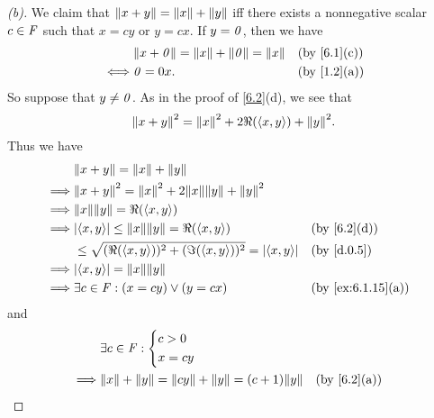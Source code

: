 \begin{proof}[(b)]
  We claim that \(\left\lVert x + y\right\rVert = \left\lVert x\right\rVert + \left\lVert y\right\rVert\) iff there exists a nonnegative scalar \(c \in \mathit{F}\) such that \(x = cy\) or \(y = cx\).
  If \(y = \mathit{0}\), then we have
  \begin{align*}
         & \norm{x + \zv} = \norm{x} + \norm{\zv} = \norm{x} &  & \text{(by \cref{6.1}(c))} \\
    \iff & \zv = 0x.                                         &  & \text{(by \cref{1.2}(a))}
  \end{align*}
  So suppose that \(y \neq \mathit{0}\).
  As in the proof of \cref{6.2}(d), we see that
  \[
    \norm{x + y}^2 = \norm{x}^2 + 2 \Re(\inn{x, y}) + \norm{y}^2.
  \]
  Thus we have
  \begin{align*}
             & \norm{x + y} = \norm{x} + \norm{y}                                                                            \\
    \implies & \norm{x + y}^2 = \norm{x}^2 + 2 \norm{x} \norm{y} + \norm{y}^2                                                \\
    \implies & \norm{x} \norm{y} = \Re(\inn{x, y})                                                                           \\
    \implies & \abs{\inn{x, y}} \leq \norm{x} \norm{y} = \Re(\inn{x, y})                &  & \text{(by \cref{6.2}(d))}       \\
             & \leq \sqrt{(\Re(\inn{x, y}))^2 + (\Im(\inn{x, y}))^2} = \abs{\inn{x, y}} &  & \text{(by \cref{d.0.5})}        \\
    \implies & \abs{\inn{x, y}} = \norm{x} \norm{y}                                                                          \\
    \implies & \exists c \in \F : (x = cy) \lor (y = cx)                                &  & \text{(by \cref{ex:6.1.15}(a))}
  \end{align*}
  and
  \begin{align*}
             & \exists c \in \F : \begin{dcases}
                                    c > 0 \\
                                    x = cy
                                  \end{dcases}                                                             \\
    \implies & \norm{x} + \norm{y} = \norm{cy} + \norm{y} = (c + 1) \norm{y} &  & \text{(by \cref{6.2}(a))} \\

\end{align*}
\end{proof}
